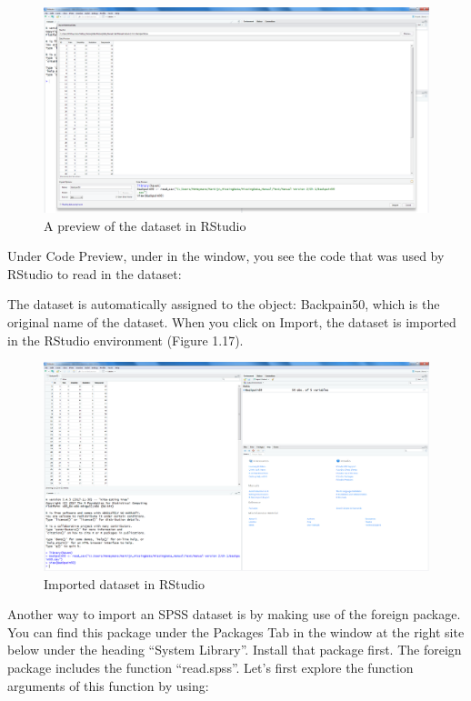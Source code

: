 \documentclass[]{book}
\theoremstyle{definition}
\theoremstyle{definition}
\theoremstyle{definition}
\theoremstyle{remark}
\begin{document}
\begin{figure}

{\centering \includegraphics[width=0.9\linewidth]{images/fig1.16} 

}

\caption{A preview of the dataset in RStudio}\label{fig:fig16}
\end{figure}

Under Code Preview, under in the window, you see the code that was used
by RStudio to read in the dataset:

The dataset is automatically assigned to the object: Backpain50, which
is the original name of the dataset. When you click on Import, the
dataset is imported in the RStudio environment (Figure 1.17).

\begin{figure}

{\centering \includegraphics[width=0.9\linewidth]{images/fig1.17} 

}

\caption{Imported dataset in RStudio}\label{fig:fig17}
\end{figure}

Another way to import an SPSS dataset is by making use of the foreign
package. You can find this package under the Packages Tab in the window
at the right site below under the heading ``System Library''. Install
that package first. The foreign package includes the function
``read.spss''. Let's first explore the function arguments of this
function by using:
\end{document}
